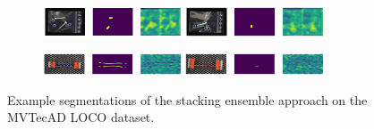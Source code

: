 \begin{figure}[H]
\begin{subfigure}[b]{\textwidth}
    \end{subfigure}
    \begin{subfigure}[b]{\textwidth}
        \centering
        \includegraphics[width=0.45\textwidth]{figures/appendix/appendix_main_ensemble/SB/image_prediction_140.png}
        \includegraphics[width=0.45\textwidth]{figures/appendix/appendix_main_ensemble/SB/image_prediction_307.png}

    \end{subfigure}
    \begin{subfigure}[b]{\textwidth}
        \centering
        \includegraphics[width=0.45\textwidth]{figures/appendix/appendix_main_ensemble/SC/image_prediction_167.png}
        \includegraphics[width=0.45\textwidth]{figures/appendix/appendix_main_ensemble/SC/image_prediction_261.png}

    \end{subfigure}
    
    \caption{Example segmentations of the stacking ensemble approach on the MVTecAD LOCO \cite{LOCODentsAndScratchesBergmann2022} dataset.}
    \label{fig:appendixEnsemble}
\end{figure}